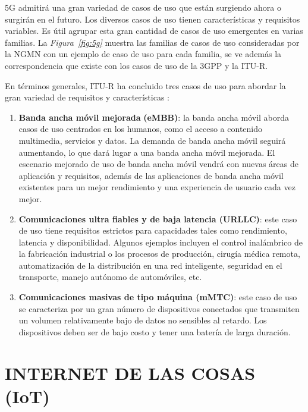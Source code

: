 5G admitirá una gran variedad de casos de uso que están surgiendo ahora o surgirán en el futuro. Los diversos casos de uso tienen características y requisitos variables. Es útil agrupar esta gran cantidad de casos de uso emergentes en varias familias. La \textit{Figura~\ref{fig:5g}} muestra las familias de casos de uso consideradas por la NGMN con un ejemplo de caso de uso para cada familia, se ve además la correspondencia que existe con los casos de uso de la 3GPP y la ITU-R.\newline

En términos generales, ITU-R ha concluido tres casos de uso para abordar la gran variedad de requisitos y características \parencite{5gMobileComms}:

\begin{enumerate}
    \item \textbf{Banda ancha móvil mejorada} \textbf{(eMBB)}: la banda ancha móvil aborda casos de uso centrados en los humanos, como el acceso a contenido multimedia, servicios y datos. La demanda de banda ancha móvil seguirá aumentando, lo que dará lugar a una banda ancha móvil mejorada. El escenario mejorado de uso de banda ancha móvil vendrá con nuevas áreas de aplicación y requisitos, además de las aplicaciones de banda ancha móvil existentes para un mejor rendimiento y una experiencia de usuario cada vez mejor.
    \item \textbf{Comunicaciones ultra fiables y de baja latencia (URLLC)}: este caso de uso tiene requisitos estrictos para capacidades tales como rendimiento, latencia y disponibilidad. Algunos ejemplos incluyen el control inalámbrico de la fabricación industrial o los procesos de producción, cirugía médica remota, automatización de la distribución en una red inteligente, seguridad en el transporte, manejo autónomo de automóviles, etc.
    \item \textbf{Comunicaciones masivas de tipo máquina (mMTC)}: este caso de uso se caracteriza por un gran número de dispositivos conectados que transmiten un volumen relativamente bajo de datos no sensibles al retardo. Los dispositivos deben ser de bajo costo y tener una batería de larga duración.
\end{enumerate}


\section{INTERNET DE LAS COSAS (IoT)}


